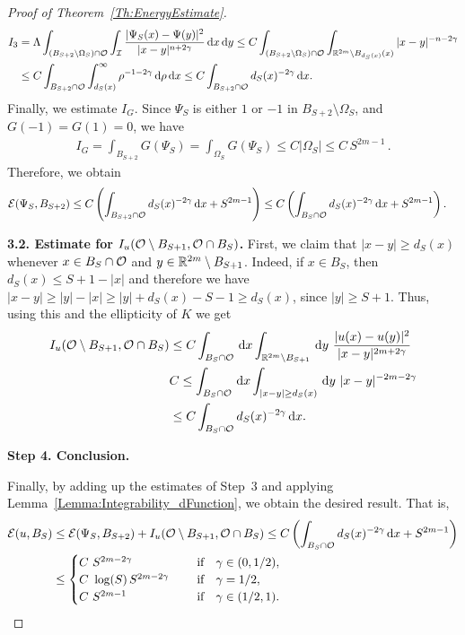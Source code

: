 \begin{proof}[Proof of Theorem~\ref{Th:EnergyEstimate}]
\begin{align*}
I_3 &= \Lambda \int_{(B_{S+2}\setminus \Omega_S) \cap \mathcal{O}} \int_{\mathcal{I}} \frac{|\Psi_S(x)-\Psi(y)|^2}{|x-y|^{n+2\gamma}} \,\mathrm{d} x\,\mathrm{d} y \leq C \int_{(B_{S+2}\setminus \Omega_S) \cap \mathcal{O}} \int_{\mathbb{R}^{2m}\setminus B_{d_S(x)}(x)} |x-y|^{-n-2\gamma} \\
&\leq C \int_{B_{S+2} \cap \mathcal{O}} \int_{d_S(x)}^\infty \rho^{-1-2\gamma} \,\mathrm{d} \rho\,\mathrm{d} x \leq C \int_{B_{S+2} \cap \mathcal{O}} d_S(x)^{-2\gamma} \,\mathrm{d} x.
\end{align*}
Finally, we estimate $I_G$. Since $\Psi_S$ is either $1$ or $-1$ in $B_{S+2}\setminus \Omega_S$, and $G(-1)=G(1)=0$, we have
\begin{align*}
I_G = \int_{B_{S+2}} G(\Psi_S) = \int_{\Omega_S} G(\Psi_S) \leq C | \Omega_S| \leq C\,S^{2m-1}\,.
\end{align*}
Therefore, we obtain
\begin{align*}
\mathcal{E}(\Psi_S,B_{S+2}) &\leq C \left(\int_{B_{S+2} \cap \mathcal{O}} d_S(x)^{-2\gamma} \,\mathrm{d} x + S^{2m-1} \right)\leq C\left(\int_{B_{S} \cap \mathcal{O}} d_S(x)^{-2\gamma} \,\mathrm{d} x + S^{2m-1} \right).
\end{align*}


\textbf{3.2. Estimate for $I_u(\mathcal{O} \setminus B_{S+1}, \mathcal{O} \cap B_S)$.} First, we claim that $|x-y|\geq d_S(x)$ whenever $x\in B_S\cap \mathcal{O}$ and $y\in \mathbb{R}^{2m}\setminus B_{S+1}$. Indeed, if $x\in B_S$, then $d_S(x) \leq S+1-|x|$ and therefore we have $|x-y|\geq |y|-|x|\geq |y|+d_S(x)-S-1 \geq  d_S(x)$, since $|y| \geq S+1$. Thus, using this and the ellipticity of $K$ we get
\begin{align*}
I_u(\ocal \setminus B_{S+1}, \ocal \cap B_S) &\leq C \int_{B_S \cap \ocal} \d x \int_{\R^{2m}\setminus B_{S+1}} \d y \ \frac{|u(x)-u(y)|^2}{|x-y|^{2m+2\s}} \\
& C \leq \int_{B_S \cap \ocal} \d x \int_{|x-y|\geq d_S(x)} \d y \ |x-y|^{-2m-2\s} \\
&\leq C \int_{B_S \cap \ocal} d_S(x)^{-2\s} \d x.
\end{align*}

\textbf{Step 4. Conclusion.}

Finally, by adding up the estimates of Step~3 and applying Lemma~\ref{Lemma:Integrability_dFunction}, we obtain the desired result. That is,
\begin{align*}
\mathcal{E}(u,B_S) &\leq \mathcal{E}(\Psi_S,B_{S+2}) + I_u(\mathcal{O} \setminus B_{S+1}, \mathcal{O} \cap B_S) \leq C\left(\int_{B_S \cap \mathcal{O}} d_S(x)^{-2\gamma} \,\mathrm{d} x + S^{2m-1} \right)\\
&\leq \begin{cases}
C \ S^{2m-2\gamma}\ \ \ &\textrm{if } \ \ \gamma\in(0,1/2),\\
C\ \log(S)\,S^{2m-2\gamma}\ \ \ \ &\textrm{if } \ \ \gamma=1/2,\\
C \ S^{2m-1}\ \ \ \ &\textrm{if } \ \ \gamma\in(1/2,1).\\
\end{cases}
\end{align*}
\end{proof}
